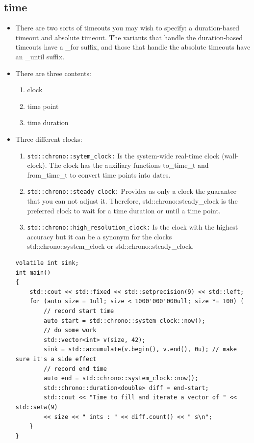 \documentclass[a4paper,11pt,twoside]{book}
\begin{document}
\subsection{time}
\begin{itemize}
	\item There are two sorts of timeouts you may wish to specify: a duration-based timeout and absolute timeout. The variants that handle the duration-based timeouts have a \_for suffix, and those that handle the absolute timeouts have an \_until suffix.
	
	\item There are three contents:
	\begin{enumerate}
		\item clock
		\item time point
		\item time duration
	\end{enumerate}

	\item Three different clocks:
	\begin{enumerate}
		\item \texttt{std::chrono::sytem\_clock:} Is the system-wide real-time clock (wall-clock). The clock has the auxiliary functions to\_time\_t and from\_time\_t to convert time points into dates.
		
		\item \texttt{std::chrono::steady\_clock:}  Provides as only a clock the guarantee that you can not adjust it. Therefore, std::chrono::steady\_clock is the preferred clock to wait for a time duration or until a time point.
		
		\item \texttt{std::chrono::high\_resolution\_clock:} Is the clock with the highest accuracy but it can be a synonym for the clocks std::chrono::system\_clock or std::chrono::steady\_clock.
	\end{enumerate}

\begin{lstlisting}[numbers=none]
volatile int sink;
int main()
{
	std::cout << std::fixed << std::setprecision(9) << std::left;
	for (auto size = 1ull; size < 1000'000'000ull; size *= 100) {
		// record start time
		auto start = std::chrono::system_clock::now();
		// do some work
		std::vector<int> v(size, 42);
		sink = std::accumulate(v.begin(), v.end(), 0u); // make sure it's a side effect
		// record end time
		auto end = std::chrono::system_clock::now();
		std::chrono::duration<double> diff = end-start;
		std::cout << "Time to fill and iterate a vector of " << std::setw(9)
		<< size << " ints : " << diff.count() << " s\n";
	}
}
\end{lstlisting}


\end{itemize}
\end{document}
